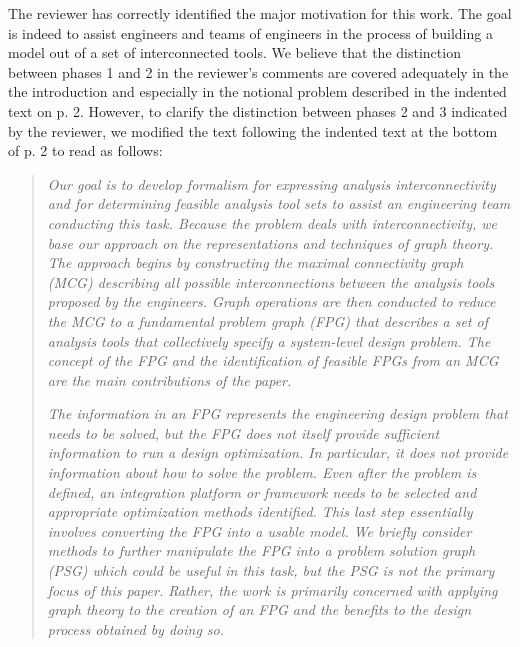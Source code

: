 \documentclass{article} %
\begin{document}
The reviewer has correctly identified the major motivation for this work. The goal is indeed to
assist engineers and teams of engineers in the process of building a model out of a set of interconnected
tools.
We believe that the distinction between phases 1 and 2 in the reviewer's  comments are covered adequately
in the the introduction and especially in the notional problem described in the indented text on p. 2.
However, to clarify the distinction between phases 2 and 3 indicated by the reviewer, we modified the text following the indented text at the bottom of p. 2 to read as follows:

\begin{quotation}
    \textit{Our goal is to develop formalism for expressing analysis interconnectivity and for determining feasible
    analysis tool sets to assist an engineering team conducting this task. Because the problem deals with
    interconnectivity, we base our approach on the representations and techniques of graph theory.
    The approach begins by constructing the \emph{maximal connectivity graph (MCG)} describing all possible
    interconnections between the analysis tools proposed by the engineers. Graph operations are then
    conducted to reduce the MCG to a \emph{fundamental problem graph (FPG)} that describes a set of analysis
    tools that collectively specify a system-level design problem. The concept of the FPG and the identification of feasible FPGs from an MCG are the main contributions of the paper.}

   \textit{ The information in an FPG represents the engineering design problem that needs to be solved, but the FPG does not
    itself provide sufficient information to run a design optimization. In particular, it does not provide information
    about \textit{how} to solve the problem. Even after the problem is defined, an integration platform or framework needs
    to be selected and appropriate optimization methods identified. This last step essentially
    involves converting the FPG into a usable model. We briefly consider methods to further
    manipulate the FPG into a \emph{problem solution graph (PSG)} which could be useful in this
    task, but the PSG is not the primary focus of this paper. Rather, the work is primarily concerned with applying graph
    theory to the creation of an FPG and the benefits to the design process obtained by doing so.}
\end{quotation}
\end{document}
